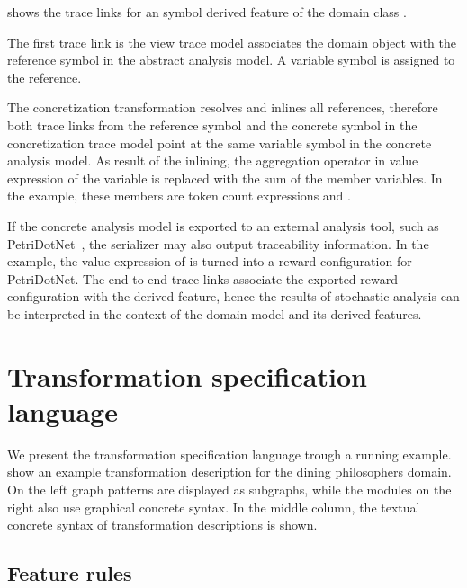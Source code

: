 \begin{runningExample}
   shows the trace links for an  symbol derived feature  of the domain class .

  The first trace link is the view trace model associates the domain object  with the reference symbol  in the abstract analysis model. A variable symbol is assigned to the reference.

  The concretization transformation resolves and inlines all references, therefore both trace links from the reference symbol and the concrete symbol in the concretization trace model point at the same variable symbol in the concrete analysis model. As result of the inlining, the aggregation operator in value expression of the variable is replaced with the sum of the member variables. In the example, these members are token count expressions  and .

  If the concrete analysis model is exported to an external analysis tool, such as PetriDotNet~\citep{Voros17pdn}, the  serializer may also output traceability information. In the example, the value expression of  is turned into a reward configuration for PetriDotNet. The end-to-end trace links associate the exported reward configuration with the derived feature, hence the results of stochastic analysis can be interpreted in the context of the domain model and its derived features.
\end{runningExample}

\section{Transformation specification language}

We present the transformation specification language trough a running example.  show an example transformation description for the dining philosophers domain. On the left graph patterns are displayed as subgraphs, while the  modules on the right also use graphical concrete syntax. In the middle column, the textual concrete syntax of transformation descriptions is shown.

\subsection{Feature rules}

